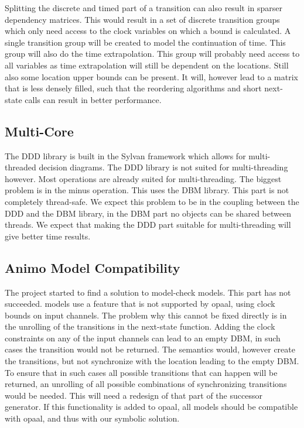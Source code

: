 Splitting the discrete and timed part of a transition can also result in sparser dependency matrices. This would result in a set of discrete transition groups which only need access to the clock variables on which a bound is calculated. A single transition group will be created to model the continuation of time. This group will also do the time extrapolation. This group will probably need access to all variables as time extrapolation will still be dependent on the locations. Still also some location upper bounds can be present. It will, however lead to a matrix that is less densely filled, such that the reordering algorithms and short next-state calls can result in better performance.

\subsection{Multi-Core}
The DDD library is built in the Sylvan framework which allows for multi-threaded decision diagrams. The DDD library is not suited for multi-threading however. Most operations are already suited for multi-threading.  The biggest problem is in the minus operation. This uses the DBM library. This part is not completely thread-safe. We expect this problem to be in the coupling between the DDD and the DBM library, in the DBM part no objects can be shared between threads. We expect that making the DDD part suitable for multi-threading will give better time results.

\subsection{Animo Model Compatibility}
The project started to find a solution to model-check \animo{} models. This part has not succeeded. \animo{} models use a \uppaal{} feature that is not supported by opaal, using clock bounds on input channels. The problem why this cannot be fixed directly is in the unrolling of the transitions in the next-state function. Adding the clock constraints on any of the input channels can lead to an empty DBM, in such cases the transition would not be returned. The semantics would, however create the transitions, but not synchronize with the location leading to the empty DBM. To ensure that in such cases all possible transitions that can happen will be returned, an unrolling of all possible combinations of synchronizing transitions would be needed. This will need a redesign of that part of the successor generator. If this functionality is added to opaal, all \animo{} models should be compatible with opaal, and thus with our symbolic solution.

